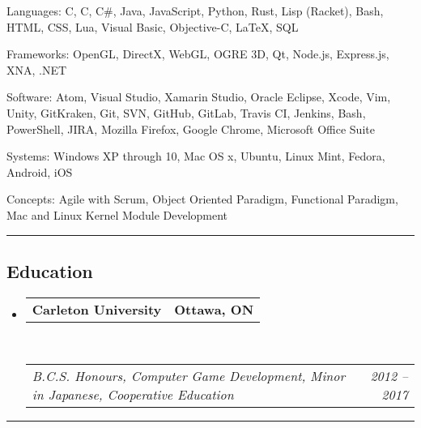 \documentclass[10pt,letterpaper]{article}
\makeatletter
\newenvironment{indentsection}[1]%
{\begin{list}{}%
  {\setlength{\leftmargin}{#1}}%
  \item[]%
}
{\end{list}}
\newcommand{\headerrow}[2]
{\begin{tabular*}{\linewidth}{l@{\extracolsep{\fill}}r}
  #1 &
  #2 \\
\end{tabular*}}
\newcommand{\CPP}
{C\nolinebreak[4]\hspace{-.05em}\raisebox{.22ex}{\footnotesize\bf ++}}
\makeatother
\begin{document}
\begin{indentsection}{\parindent}
\begin{description*}
  \item[Languages:]
  C, \CPP, C\#, Java, JavaScript, Python, Rust, Lisp (Racket), Bash, HTML, CSS,
  Lua, Visual Basic, Objective-C, \LaTeX, SQL
  \\
  \item[Frameworks:]
  OpenGL, DirectX, WebGL, OGRE 3D, Qt, Node.js, Express.js, XNA, .NET
  \\
  \item[Software:]
  Atom, Visual Studio, Xamarin Studio, Oracle Eclipse, Xcode, Vim, Unity,
  GitKraken, Git, SVN, GitHub, GitLab, Travis CI, Jenkins, Bash, PowerShell,
  JIRA, Mozilla Firefox, Google Chrome, Microsoft Office Suite
  \\
  \item[Systems:]
  Windows XP through 10, Mac OS x, Ubuntu, Linux Mint, Fedora, Android, iOS
  \\
  \item[Concepts:]
  Agile with Scrum, Object Oriented Paradigm, Functional Paradigm, Mac and Linux
  Kernel Module Development
\end{description*}
\end{indentsection}

\hrule
\vspace{-0.4em}
\subsection*{Education}

\begin{itemize}
  \parskip=0.1em

  \item
  \headerrow
    {\textbf{Carleton University}}
    {\textbf{Ottawa, ON}}
  \\
  \headerrow
    {\emph{B.C.S. Honours, Computer Game Development, Minor in Japanese,
           Cooperative Education}}
    {\emph{2012 -- 2017}}

\end{itemize}

\hrule
\vspace{-0.4em}
\end{document}
